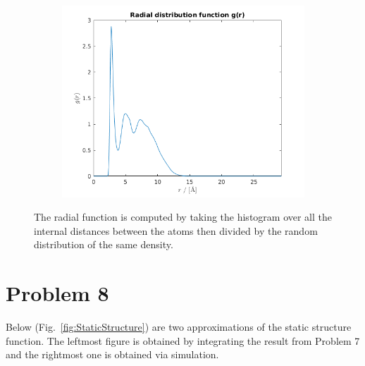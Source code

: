 \begin{figure}[H]
\centering
\captionsetup[subfigure]{justification=centering}
\begin{subfigure}[b]{0.40\textwidth}
	\centering
	\includegraphics[width=\textwidth]{graphics/task7/radial.png}
\end{subfigure}
\caption{The radial function is computed by taking the histogram over all the internal distances between the atoms then divided by the random distribution of the same density.}
\label{fig:radial}
\end{figure}

\section*{Problem 8}

Below (Fig.~\ref{fig:StaticStructure}) are two approximations of the static structure function. The leftmost figure is obtained by integrating the result from Problem 7 and the rightmost one is obtained via simulation. 

